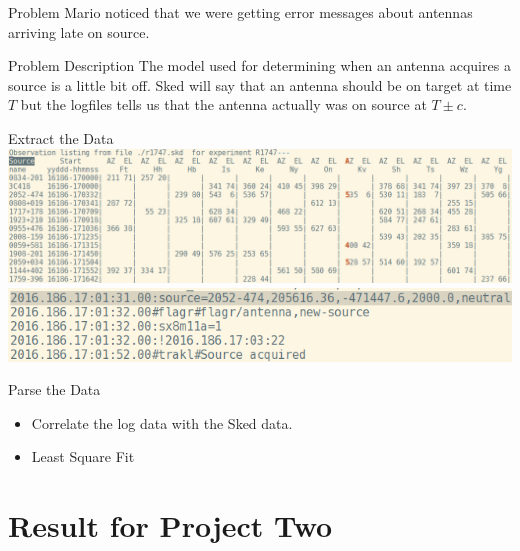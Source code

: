 \documentclass{beamer}
\begin{document}
    \begin{frame}{Problem}
        Mario noticed that we were getting error messages about antennas
        arriving late on source.
    \end{frame}

    \begin{frame}{Problem Description}
        The model used for determining when an antenna acquires a source is a
        little bit off. Sked will say that an antenna should be on target at
        time $T$ but the logfiles tells us that the antenna actually was on
        source at $T \pm c$.
    \end{frame}
    \begin{frame}{Extract the Data}
        \centering
        \includegraphics[width=1\columnwidth]{skds}\\[2ex]
        \includegraphics[width=0.75\columnwidth]{logs}
    \end{frame}
    \begin{frame}{Parse the Data}
        \begin{itemize}[<+-|alert@+>]
            \item Correlate the log data with the Sked data.
            \item Least Square Fit
        \end{itemize}
    \end{frame}


    \section{Result for Project Two}

\end{document}
